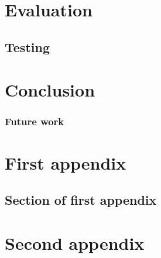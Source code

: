 \documentclass{mproj}
\begin{document}
\chapter{Evaluation}
\section{Testing}

\chapter{Conclusion}\label{conclusion}
\subsection{Future work}

\appendix %
\chapter{First appendix}

\section{Section of first appendix}

\chapter{Second appendix}



\end{document}
